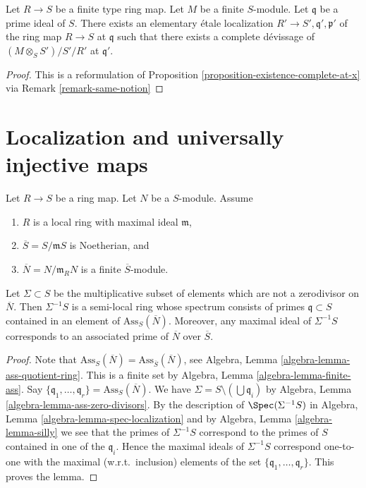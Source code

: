 \begin{lemma}
\label{lemma-existence-algebra}
Let $R \to S$ be a finite type ring map.
Let $M$ be a finite $S$-module.
Let $\mathfrak q$ be a prime ideal of $S$.
There exists an elementary \'etale localization
$R' \to S', \mathfrak q', \mathfrak p'$ of
the ring map $R \to S$ at $\mathfrak q$ such that
there exists a complete d\'evissage of
$(M \otimes_S S')/S'/R'$ at $\mathfrak q'$.
\end{lemma}

\begin{proof}
This is a reformulation of
Proposition \ref{proposition-existence-complete-at-x}
via
Remark \ref{remark-same-notion}
\end{proof}




\section{Localization and universally injective maps}
\label{section-localize-universally-injective}


\begin{lemma}
\label{lemma-homothety-spectrum}
Let $R \to S$ be a ring map.
Let $N$ be a $S$-module.
Assume
\begin{enumerate}
\item $R$ is a local ring with maximal ideal $\mathfrak m$,
\item $\overline{S} = S/\mathfrak m S$ is Noetherian, and
\item $\overline{N} = N/\mathfrak m_R N$ is a finite $\overline{S}$-module.
\end{enumerate}
Let $\Sigma \subset S$ be the multiplicative subset of elements which are not
a zerodivisor on $\overline{N}$. Then $\Sigma^{-1}S$ is a semi-local ring
whose spectrum consists of primes $\mathfrak q \subset S$ contained in an
element of $\text{Ass}_S(\overline{N})$. Moreover, any maximal
ideal of $\Sigma^{-1}S$ corresponds to an associated prime of
$\overline{N}$ over $\overline{S}$.
\end{lemma}

\begin{proof}
Note that
$\text{Ass}_S(\overline{N}) = \text{Ass}_{\overline{S}}(\overline{N})$, see
Algebra, Lemma \ref{algebra-lemma-ass-quotient-ring}.
This is a finite set by
Algebra, Lemma \ref{algebra-lemma-finite-ass}.
Say $\{\mathfrak q_1, \ldots, \mathfrak q_r\} = \text{Ass}_S(\overline{N})$.
We have $\Sigma = S \setminus (\bigcup \mathfrak q_i)$ by
Algebra, Lemma \ref{algebra-lemma-ass-zero-divisors}.
By the description of $\Spec(\Sigma^{-1}S)$ in
Algebra, Lemma \ref{algebra-lemma-spec-localization}
and by
Algebra, Lemma \ref{algebra-lemma-silly}
we see that the primes of $\Sigma^{-1}S$ correspond to the primes of
$S$ contained in one of the $\mathfrak q_i$.
Hence the maximal ideals of $\Sigma^{-1}S$ correspond one-to-one with the
maximal (w.r.t.\ inclusion) elements of the set
$\{\mathfrak q_1, \ldots, \mathfrak q_r\}$. This proves the lemma.
\end{proof}

